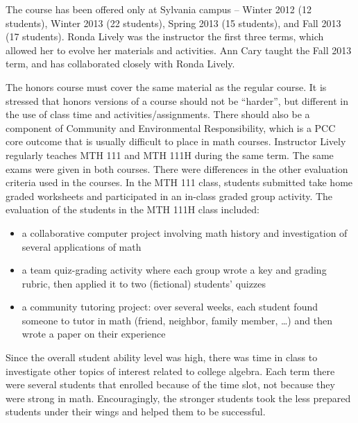 The course has been offered only at Sylvania campus -- Winter 2012 (12
students), Winter 2013 (22 students), Spring 2013 (15 students), and Fall 2013
(17 students).  Ronda Lively was the instructor the first three terms, which
allowed her to evolve her materials and activities.  Ann Cary taught the
Fall 2013 term, and has collaborated closely with Ronda Lively. 

The honors course must cover the same material as the regular course. It
is stressed that honors versions of a course should not be ``harder'', but
different in the use of class time and activities/assignments.  There should
also be a component of Community and Environmental Responsibility, which is a
PCC core outcome that is usually difficult to place in math courses.  Instructor
Lively regularly teaches MTH 111 and MTH 111H during the same term.  The same
exams were given in both courses.  There were differences in the other evaluation
criteria used in the courses.  In the MTH 111 class, students submitted take
home graded worksheets and participated in an in-class graded group activity.
The evaluation of the students in the MTH 111H class included:
\begin{itemize}
\item a collaborative computer project involving math history and investigation
  of several applications of math
\item a team quiz-grading activity where each group wrote a key and grading
  rubric, then applied it to two (fictional) students' quizzes
\item a community tutoring project:  over several weeks, each student found someone to
  tutor in math (friend, neighbor, family member, \ldots) and then wrote a paper
  on their experience
\end{itemize}
Since the overall student ability level was high, there was time in class to
investigate other topics of interest related to college algebra.  Each term
there were several students that enrolled because of the time slot,
not because they were strong in math.  Encouragingly, the
stronger students took the less prepared students under their wings and helped
them to be successful.



